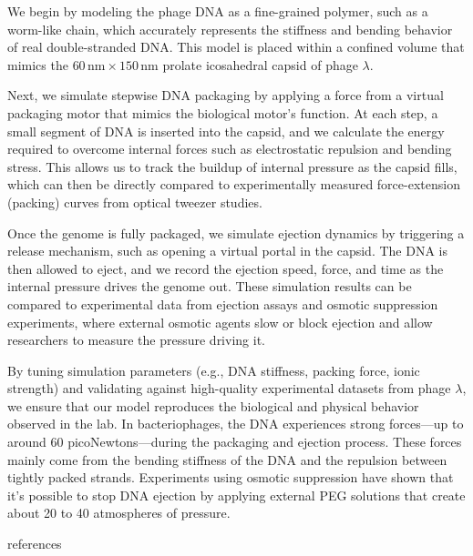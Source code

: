 \documentclass[12pt]{article}
\begin{document}
\begin{flushleft}
We begin by modeling the phage DNA as a fine-grained polymer, such as a worm-like chain, which accurately represents the stiffness and bending behavior of real double-stranded DNA. This model is placed within a confined volume that mimics the $60\,\text{nm} \times 150\,\text{nm}$ prolate icosahedral capsid of phage $\lambda$.
 


Next, we simulate stepwise DNA packaging by applying a force from a virtual packaging motor that mimics the biological motor’s function. At each step, a small segment of DNA is inserted into the capsid, and we calculate the energy required to overcome internal forces such as electrostatic repulsion and bending stress. This allows us to track the buildup of internal pressure as the capsid fills, which can then be directly compared to experimentally measured force-extension (packing) curves from optical tweezer studies.

Once the genome is fully packaged, we simulate ejection dynamics by triggering a release mechanism, such as opening a virtual portal in the capsid. The DNA is then allowed to eject, and we record the ejection speed, force, and time as the internal pressure drives the genome out. These simulation results can be compared to experimental data from ejection assays and osmotic suppression experiments, where external osmotic agents slow or block ejection and allow researchers to measure the pressure driving it.


By tuning simulation parameters (e.g., DNA stiffness, packing force, ionic strength) and validating against high-quality experimental datasets from phage $\lambda$, we ensure that our model reproduces the biological and physical behavior observed in the lab. In bacteriophages, the DNA experiences strong forces—up to around 60 picoNewtons—during the packaging and ejection process. These forces mainly come from the bending stiffness of the DNA and the repulsion between tightly packed strands. Experiments using osmotic suppression have shown that it's possible to stop DNA ejection by applying external PEG solutions that create about 20 to 40 atmospheres of pressure\cite{Grayson2006}.




\end{flushleft}

 {references}  
\end{document}
